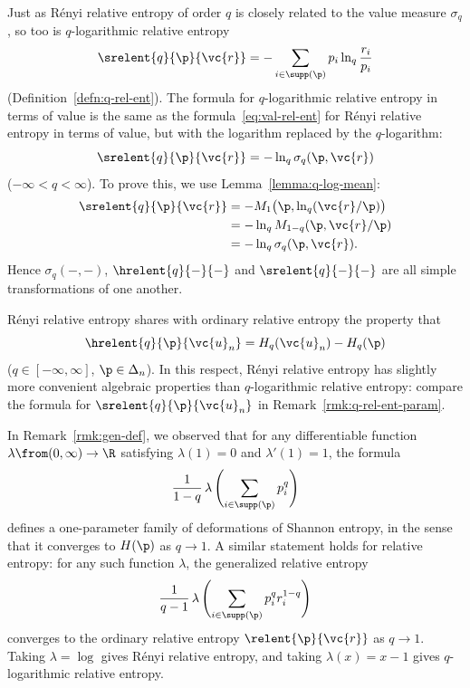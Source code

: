 Just as R\'enyi relative entropy of order $q$ is closely related to the
value measure $\sigma_q$, so too is $q$-logarithmic relative entropy
\[
\srelent{q}{\p}{\vc{r}}
=
- \sum_{i \in \supp(\p)} p_i \ln_q \frac{r_i}{p_i}
\]
(Definition~\ref{defn:q-rel-ent}).  The formula for $q$-logarithmic
relative entropy in terms of value is the same as the
formula~\eqref{eq:val-rel-ent} for R\'enyi relative entropy in terms of
value, but with the logarithm replaced by the $q$-logarithm:
\[
\srelent{q}{\p}{\vc{r}}
=
- \ln_q \sigma_q(\p, \vc{r})
\]
($-\infty < q < \infty$).  To prove this, we use
Lemma~\ref{lemma:q-log-mean}: 
% 
\begin{align*}
\srelent{q}{\p}{\vc{r}}
&
=
- M_1 \bigl(\p, \ln_q(\vc{r}/\p) \bigr) \\
&
=
- \ln_q M_{1 - q} (\p, \vc{r}/\p) \\
&
=
- \ln_q \sigma_q(\p, \vc{r}).     
\end{align*}
% 
Hence $\sigma_q(-,-)$, $\hrelent{q}{-}{-}$ and $\srelent{q}{-}{-}$ are
all simple transformations of one another.

R\'enyi relative entropy shares with ordinary relative entropy the
property that
\[
\hrelent{q}{\p}{\vc{u}_n}
=
H_q(\vc{u}_n) - H_q(\p)
\]
($q \in [-\infty, \infty]$, $\p \in \Delta_n$).  In this respect, R\'enyi
relative entropy has slightly more%
%
%
%
convenient algebraic properties than
$q$-logarithmic relative entropy: compare the formula for
$\srelent{q}{\p}{\vc{u}_n}$ in Remark~\ref{rmk:q-rel-ent-param}.

\begin{remark}
In Remark~\ref{rmk:gen-def}, we observed that for any differentiable
function $\lambda\from (0, \infty) \to \R$ satisfying $\lambda(1) = 0$ and
$\lambda'(1) = 1$, the formula
\[
\frac{1}{1 - q} \, 
\lambda\,
\Biggl( \sum_{i \in \supp(\p)} p_i^q \Biggr)
\]
defines a one-parameter family of deformations of Shannon entropy, in the
sense that it converges to $H(\p)$ as $q \to 1$.  A similar statement holds
for relative entropy: for any such function $\lambda$, the generalized
relative entropy
\[
\frac{1}{q - 1} \,
\lambda\,
\Biggl( \sum_{i \in \supp(\p)} p_i^q r_i^{1 - q} \Biggr)
\]
converges to the ordinary relative entropy $\relent{\p}{\vc{r}}$ as $q \to
1$.  Taking $\lambda = \log$ gives R\'enyi relative entropy, and taking
$\lambda(x) = x - 1$ gives $q$-logarithmic relative entropy.
\end{remark}


